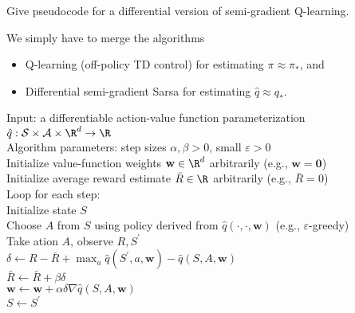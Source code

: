 
\begin{exercise}[Exercise 10.4]

Give pseudocode for a differential version of semi-gradient Q-learning.

\end{exercise}


\begin{solution}

We simply have to merge the algorithms

\begin{itemize}
    \item Q-learning (off-policy TD control) for estimating $\pi \approx \pi_\ast$, and
    \item Differential semi-gradient Sarsa for estimating $\hat q \approx q_\ast$.
\end{itemize}

\begin{tcolorbox}[title = {Differential semi-gradient Q-learning for estimating $\hat q \approx q_\ast$}]
    Input: a differentiable action-value function parameterization $\hat q: \mathcal S \times \mathcal A \times \R^d \to \R$ \\
    Algorithm parameters: step sizes $\alpha, \beta > 0$, small $\varepsilon > 0$ \\
    Initialize value-function weights $\mathbf w \in \R^d$ arbitrarily (e.g., $\mathbf w = \mathbf 0$) \\
    Initialize average reward estimate $\bar R \in \R$ arbitrarily (e.g., $\bar R = 0$) \\

    Loop for each step: \\
    \hspace*{0.5cm} Initialize state $S$ \\
    \hspace*{0.5cm} Choose $A$ from $S$ using policy derived from $\hat q(\cdot, \cdot, \mathbf w)$ (e.g., $\varepsilon$-greedy) \\
    \hspace*{0.5cm} Take ation $A$, observe $R, S^\prime$ \\
    \hspace*{0.5cm} $\delta \leftarrow R - \bar R + \max_a \hat q(S^\prime, a, \mathbf w) - \hat q(S, A, \mathbf w)$ \\
    \hspace*{0.5cm} $\bar R \leftarrow \bar R + \beta \delta$ \\
    \hspace*{0.5cm} $\mathbf w \leftarrow \mathbf w + \alpha \delta \nabla \hat q(S, A, \mathbf w)$ \\
    \hspace*{0.5cm} $S \leftarrow S^\prime$
\end{tcolorbox}

\end{solution}

